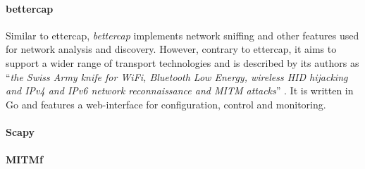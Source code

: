 \paragraph{bettercap} Similar to ettercap, \emph{bettercap} implements network sniffing and other features used for network analysis and discovery. However, contrary to ettercap, it aims to support a wider range of transport technologies and is described by its authors as \enquote{\emph{the Swiss Army knife for WiFi, Bluetooth Low Energy, wireless HID hijacking and IPv4 and IPv6 network reconnaissance and MITM attacks}} \cite{bettercap}. It is written in Go and features a web-interface for configuration, control and monitoring.
\paragraph{Scapy}
\paragraph{MITMf} %
